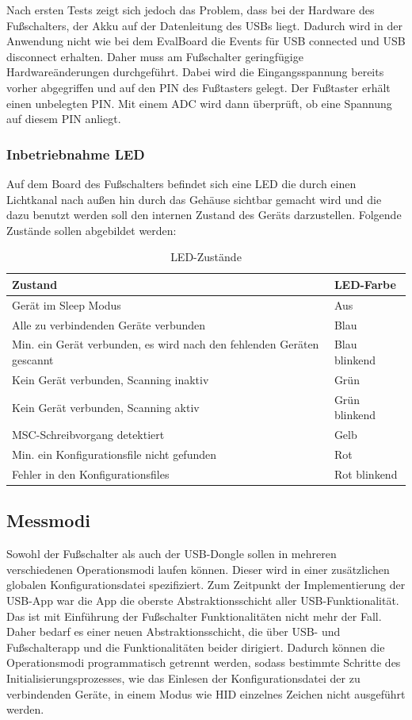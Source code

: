Nach ersten Tests zeigt sich jedoch das Problem, dass bei der Hardware des Fußschalters, der Akku auf der Datenleitung des USBs liegt. Dadurch wird in der Anwendung nicht wie bei dem EvalBoard die Events für USB connected und USB disconnect erhalten. Daher muss am Fußschalter geringfügige Hardwareänderungen durchgeführt. Dabei wird die Eingangsspannung bereits vorher abgegriffen und auf den PIN des Fußtasters gelegt. Der Fußtaster erhält einen unbelegten PIN. Mit einem ADC wird dann überprüft, ob eine Spannung auf diesem PIN anliegt.

\subsubsection{Inbetriebnahme LED}
Auf dem Board des Fußschalters befindet sich eine LED die durch einen Lichtkanal nach außen hin durch das Gehäuse sichtbar gemacht wird und die dazu benutzt werden soll den internen Zustand des Geräts darzustellen. Folgende Zustände sollen abgebildet werden: 

\begin{table}[H]
	\centering
	\begin{tabular}[H]{l|l}
		Zustand & LED-Farbe \\
		\hline
		Gerät im Sleep Modus & Aus \\
		\hline
		Alle zu verbindenden Geräte verbunden & Blau \\
		\hline
		Min. ein Gerät verbunden, es wird nach den fehlenden Geräten gescannt & Blau blinkend \\
		\hline
		Kein Gerät verbunden, Scanning inaktiv & Grün \\
		\hline
		Kein Gerät verbunden, Scanning aktiv & Grün blinkend \\
		\hline
		MSC-Schreibvorgang detektiert & Gelb \\
		\hline
		Min. ein Konfigurationsfile nicht gefunden & Rot \\
		\hline
		Fehler in den Konfigurationsfiles & Rot blinkend \\
	\end{tabular}
	\caption{LED-Zustände}
\end{table}


\subsection{Messmodi}
Sowohl der Fußschalter als auch der USB-Dongle sollen in mehreren verschiedenen Operationsmodi laufen können. Dieser wird in einer zusätzlichen globalen Konfigurationsdatei spezifiziert. Zum Zeitpunkt der Implementierung der USB-App war die App die oberste Abstraktionsschicht aller USB-Funktionalität. Das ist mit Einführung der Fußschalter Funktionalitäten nicht mehr der Fall. Daher bedarf es einer neuen Abstraktionsschicht, die über USB- und Fußschalterapp und die Funktionalitäten beider dirigiert. Dadurch können die Operationsmodi programmatisch getrennt werden, sodass bestimmte Schritte des Initialisierungsprozesses, wie das Einlesen der Konfigurationsdatei der zu verbindenden Geräte, in einem Modus wie HID einzelnes Zeichen nicht ausgeführt werden.

